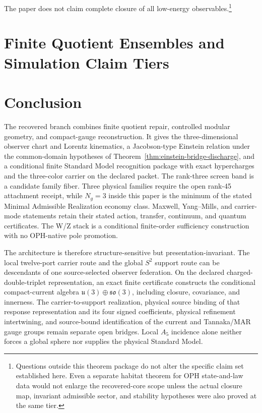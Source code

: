 \documentclass[11pt]{article}
\begin{document}
The paper does not claim complete closure of all low-energy observables.\footnote{Questions outside this theorem package do not alter the specific claim set established here. Even a separate habitat theorem for OPH state-and-law data would not enlarge the recovered-core scope unless the actual closure map, invariant admissible sector, and stability hypotheses were also proved at the same tier.}
\section{Finite Quotient Ensembles and Simulation Claim Tiers}



\section{Conclusion}

The recovered branch combines finite quotient repair, controlled modular
geometry, and compact-gauge reconstruction. It gives the three-dimensional
observer chart and Lorentz kinematics, a Jacobson-type Einstein relation under
the common-domain hypotheses of Theorem~\ref{thm:einstein-bridge-discharge},
and a conditional finite Standard Model recognition package with exact
hypercharges and the three-color carrier on the declared packet. The
rank-three screen band is a candidate family fiber. Three physical families
require the open rank-45 attachment receipt, while \(N_g=3\) inside this paper
is the minimum of the stated Minimal Admissible Realization economy class.
Maxwell, Yang--Mills, and carrier-mode statements retain their stated action,
transfer, continuum, and quantum certificates. The W/Z stack is a conditional
finite-order sufficiency construction with no OPH-native pole promotion.

The architecture is therefore structure-sensitive but presentation-invariant.
The local twelve-port carrier route and the global \(S^2\) support route can be
descendants of one source-selected observer federation.  On the declared
charged-double-triplet representation, an exact finite certificate
constructs the conditional compact-current algebra
\(\mathfrak u(3)\oplus\mathfrak{so}(3)\), including closure, covariance, and
innerness.  The carrier-to-support realization, physical source binding of
that response representation and its four signed coefficients, physical
refinement intertwining, and source-bound identification of the current and
Tannaka/MAR gauge groups remain separate open bridges. Local \(A_5\) incidence
alone neither forces a global sphere nor supplies the physical Standard Model.
\end{document}
